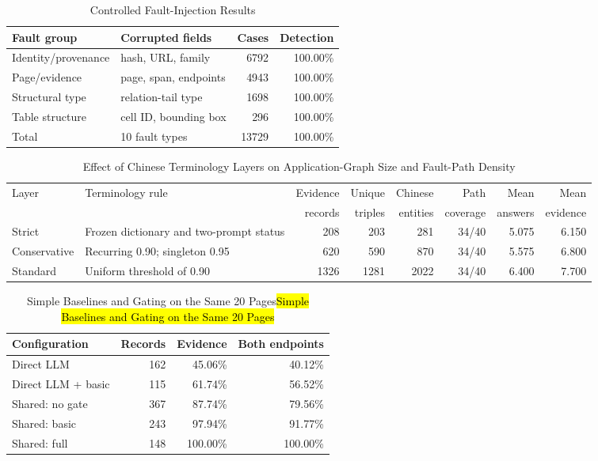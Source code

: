 \documentclass[conference,a4paper]{IEEEtran}
\DeclareRobustCommand{\rev}[1]{\ifdefined\CleanVersion#1\else\hl{#1}\fi}
\newcommand{\revtable}{\ifdefined\CleanVersion\else\rowcolors{1}{yellow!25}{yellow!25}\fi}
\begin{document}
\begin{table}[t]
\caption{Controlled Fault-Injection Results}
\label{tab:mutation}
\centering
\footnotesize
\setlength{\tabcolsep}{3.0pt}
\begin{tabular}{llrr}
\toprule
Fault group & Corrupted fields & Cases & Detection \\
\midrule
Identity/provenance & hash, URL, family & 6792 & 100.00\% \\
Page/evidence       & page, span, endpoints & 4943 & 100.00\% \\
Structural type     & relation-tail type & 1698 & 100.00\% \\
Table structure     & cell ID, bounding box & 296 & 100.00\% \\
\midrule
Total & 10 fault types & 13729 & 100.00\% \\
\bottomrule
\end{tabular}
\end{table}

\begin{table}[!t]
\caption{Effect of Chinese Terminology Layers on Application-Graph Size and Fault-Path Density}
\label{tab:tiers}
\centering
\footnotesize
\setlength{\tabcolsep}{3.5pt}
\begin{tabularx}{\textwidth}{l>{\raggedright\arraybackslash}Xrrrrrr}
\toprule
Layer & Terminology rule & Evidence & Unique & Chinese & Path & Mean & Mean \\
      &                  & records  & triples & entities & coverage & answers & evidence \\
\midrule
Strict & Frozen dictionary and two-prompt status & 208  & 203  & 281  & 34/40 & 5.075 & 6.150 \\
Conservative & Recurring 0.90; singleton 0.95 & 620  & 590  & 870  & 34/40 & 5.575 & 6.800 \\
Standard & Uniform threshold of 0.90 & 1326 & 1281 & 2022 & 34/40 & 6.400 & 7.700 \\
\bottomrule
\end{tabularx}
\end{table}

\begin{table}[!t]
\caption{\rev{Simple Baselines and Gating on the Same 20 Pages}}
\label{tab:prompt}
\centering
\footnotesize
\setlength{\tabcolsep}{3pt}
\revtable
\begin{tabular}{lrrr}
\toprule
Configuration & Records & Evidence & Both endpoints \\
\midrule
Direct LLM & 162 & 45.06\% & 40.12\% \\
Direct LLM + basic & 115 & 61.74\% & 56.52\% \\
\midrule
Shared: no gate & 367 & 87.74\% & 79.56\% \\
Shared: basic & 243 & 97.94\% & 91.77\% \\
Shared: full & 148 & 100.00\% & 100.00\% \\
\bottomrule
\end{tabular}
\end{table}
\end{document}
